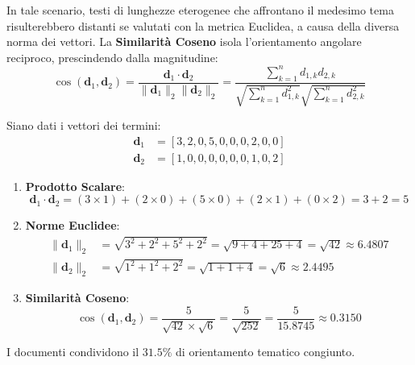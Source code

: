 In tale scenario, testi di lunghezze eterogenee che affrontano il medesimo tema risulterebbero distanti se valutati con la metrica Euclidea, a causa della diversa norma dei vettori. La \textbf{Similarità Coseno} isola l'orientamento angolare reciproco, prescindendo dalla magnitudine:
\begin{equation}
    \cos(\mathbf{d}_1, \mathbf{d}_2) = \frac{\mathbf{d}_1 \cdot \mathbf{d}_2}{\|\mathbf{d}_1\|_2 \|\mathbf{d}_2\|_2} = \frac{\sum_{k=1}^n d_{1,k} d_{2,k}}{\sqrt{\sum_{k=1}^n d_{1,k}^2} \sqrt{\sum_{k=1}^n d_{2,k}^2}}
    \label{eq:dm-cosine}
\end{equation}

\begin{example}
Siano dati i vettori dei termini:
\begin{align}
    \mathbf{d}_1 &= [3, 2, 0, 5, 0, 0, 0, 2, 0, 0] \\
    \mathbf{d}_2 &= [1, 0, 0, 0, 0, 0, 0, 1, 0, 2]
\end{align}
\begin{enumerate}
    \item \textbf{Prodotto Scalare}:
    \begin{equation}
        \mathbf{d}_1 \cdot \mathbf{d}_2 = (3 \times 1) + (2 \times 0) + (5 \times 0) + (2 \times 1) + (0 \times 2) = 3 + 2 = 5
    \end{equation}
    \item \textbf{Norme Euclidee}:
    \begin{align}
        \|\mathbf{d}_1\|_2 &= \sqrt{3^2 + 2^2 + 5^2 + 2^2} = \sqrt{9 + 4 + 25 + 4} = \sqrt{42} \approx 6.4807 \\
        \|\mathbf{d}_2\|_2 &= \sqrt{1^2 + 1^2 + 2^2} = \sqrt{1 + 1 + 4} = \sqrt{6} \approx 2.4495
    \end{align}
    \item \textbf{Similarità Coseno}:
    \begin{equation}
        \cos(\mathbf{d}_1, \mathbf{d}_2) = \frac{5}{\sqrt{42} \times \sqrt{6}} = \frac{5}{\sqrt{252}} = \frac{5}{15.8745} \approx 0.3150
    \end{equation}
\end{enumerate}
I documenti condividono il $31.5\%$ di orientamento tematico congiunto.
\end{example}

\FloatBarrier
